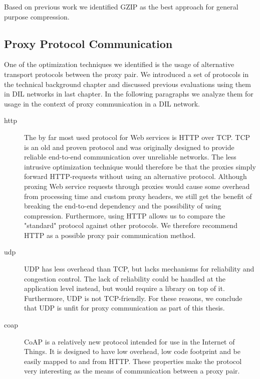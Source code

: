 Based on previous work we identified GZIP as the best approach for general
purpose compression.

\subsection{Proxy Protocol Communication}

One of the optimization techniques we identified is the usage of alternative
transport protocols between the proxy pair. We introduced a set of protocols in
the technical background chapter and discussed previous evaluations using them
in DIL networks in last chapter. In the following paragraphs we analyze them for
usage in the context of proxy communication in a DIL network.

\begin{description}

    \item[\gls{http}] The by far most used protocol for Web services is HTTP
    over TCP. TCP is an old and proven protocol and was originally designed to
    provide reliable end-to-end communication over unreliable networks. The
    less intrusive optimization technique would therefore be that the proxies
    simply forward HTTP-requests without using an alternative protocol.
    Although proxing Web service requests through proxies would cause some overhead from
    processing time and custom proxy headers, we still get the benefit of
    breaking the end-to-end dependency and the possibility of using compression.
    Furthermore, using HTTP allows us to compare the "standard" protocol against
    other protocols. We therefore recommend HTTP as a possible proxy pair
    communication method.

    \item[\gls{udp}] UDP has less overhead than TCP, but lacks mechanisms for
    reliability and congestion control. The lack of reliability could be handled
    at the application level instead, but would require a library on top of it.
    Furthermore, UDP is not TCP-friendly. For these reasons, we conclude that UDP
    is unfit for proxy communication as part of this thesis.

	\item[\gls{coap}] CoAP is a relatively new protocol intended for use in the
	Internet of Things. It is designed to have low overhead, low code footprint
	and be easily mapped to and from HTTP. These properties make the protocol
	very interesting as the means of communication between a proxy pair.


\end{description}
